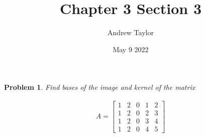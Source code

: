 \documentclass{article}
\title{Chapter 3 Section 3}
\author{Andrew Taylor}
\date{May 9 2022}
\newtheorem{problem}{Problem}
\begin{document}
\maketitle

\begin{problem}
Find bases of the image and kernel of the matrix

\begin{align*}
A = \begin{bmatrix}
1 & 2 & 0 & 1 & 2 \\
1 & 2 & 0 & 2 & 3 \\
1 & 2 & 0 & 3 & 4 \\
1 & 2 & 0 & 4 & 5
\end{bmatrix}
\end{align*}
\end{problem}
\end{document}
